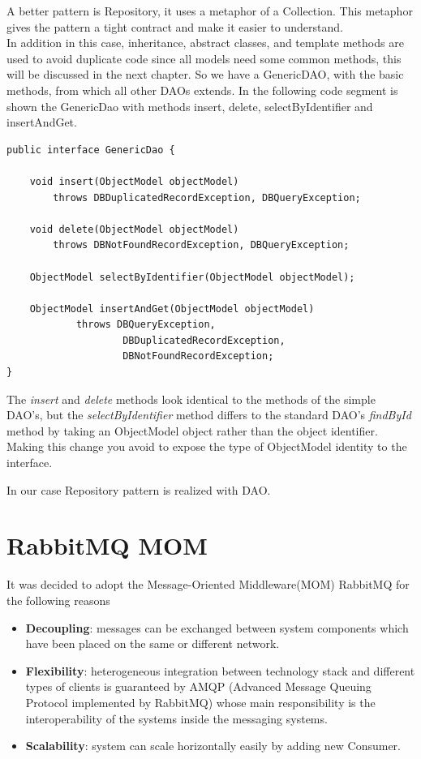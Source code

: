 \documentclass[a4paper,12pt]{report}
\begin{document}
A better pattern is Repository, it uses a metaphor of a Collection. This metaphor gives the pattern a tight contract and make it easier to understand.\\
In addition in this case, inheritance, abstract classes, and template methods are used to avoid duplicate code since all models need some common methods, this will be discussed in the next chapter.
So we have a GenericDAO, with the basic methods, from which all other DAOs extends.
In the following code segment is shown the GenericDao with methods insert, delete, selectByIdentifier and insertAndGet.\\
\begin{lstlisting}
public interface GenericDao {

    void insert(ObjectModel objectModel) 
    	throws DBDuplicatedRecordException, DBQueryException;

    void delete(ObjectModel objectModel) 
    	throws DBNotFoundRecordException, DBQueryException;

    ObjectModel selectByIdentifier(ObjectModel objectModel);

    ObjectModel insertAndGet(ObjectModel objectModel)
            throws DBQueryException, 
            		DBDuplicatedRecordException, 
            		DBNotFoundRecordException;
}

\end{lstlisting}

The \textit{insert} and \textit{delete} methods look identical to the methods of the simple DAO's, but the \textit{selectByIdentifier} method differs to the standard DAO’s \textit{findById} method by taking an ObjectModel object rather than the object identifier. 
Making this change you avoid to expose the type of ObjectModel identity to the interface.

In our case Repository pattern is realized with DAO.
\section{RabbitMQ MOM}
It was decided to adopt the Message-Oriented Middleware(MOM) RabbitMQ for the following reasons
\begin{itemize}
\item \textbf{Decoupling}: messages can be exchanged between system components which have been placed on the same or different network.
\item \textbf{Flexibility}: heterogeneous integration between technology stack and different types of clients is guaranteed by AMQP (Advanced Message Queuing Protocol implemented by RabbitMQ) whose main responsibility is the interoperability of the systems inside the messaging systems.
\item \textbf{Scalability}: system can scale horizontally easily by adding new Consumer.
\end{itemize}
\end{document}
